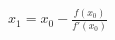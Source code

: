 \documentclass[preview]{standalone}
\begin{document}
\begin{align*}
x_1 = x_0 - \frac{f(x_0)}{f'(x_0)}
\end{align*}
\end{document}
